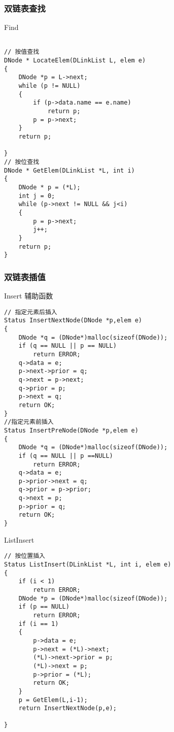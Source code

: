 \subsubsection{双链表查找}
\begin{macbox}{Find}
	\begin{verbatim}

// 按值查找
DNode * LocateElem(DLinkList L, elem e)
{
    DNode *p = L->next;
    while (p != NULL)
    {
        if (p->data.name == e.name)
            return p;
        p = p->next;
    }
    return p;

}
// 按位查找
DNode * GetElem(DLinkList *L, int i)
{
    DNode * p = (*L);
    int j = 0;
    while (p->next != NULL && j<i)
    {
        p = p->next;
        j++;
    }
    return p;
}  
    \end{verbatim}
\end{macbox}

\subsubsection{双链表插值}
\begin{macbox}{Insert 辅助函数}
	\begin{verbatim}
// 指定元素后插入
Status InsertNextNode(DNode *p,elem e)
{
    DNode *q = (DNode*)malloc(sizeof(DNode));
    if (q == NULL || p == NULL)
        return ERROR;
    q->data = e;
    p->next->prior = q;
    q->next = p->next;
    q->prior = p;
    p->next = q;
    return OK;
}
//指定元素前插入
Status InsertPreNode(DNode *p,elem e)
{
    DNode *q = (DNode*)malloc(sizeof(DNode));
    if (q == NULL || p ==NULL)
        return ERROR;
    q->data = e;
    p->prior->next = q;
    q->prior = p->prior;
    q->next = p;
    p->prior = q;
    return OK;
}
    \end{verbatim}
\end{macbox}

\begin{macbox}{ListInsert}
	\begin{verbatim}
// 按位置插入
Status ListInsert(DLinkList *L, int i, elem e)
{
    if (i < 1)
        return ERROR;
    DNode *p = (DNode*)malloc(sizeof(DNode));
    if (p == NULL)
        return ERROR;
    if (i == 1)
    {
        p->data = e;
        p->next = (*L)->next;
        (*L)->next->prior = p;
        (*L)->next = p;
        p->prior = (*L);
        return OK;
    }
    p = GetElem(L,i-1);
    return InsertNextNode(p,e);

} 
    \end{verbatim}
\end{macbox}
